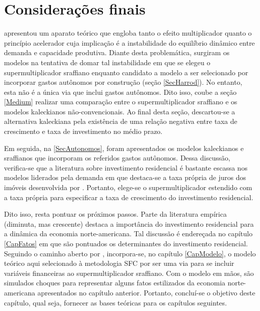 \section{Considerações finais}
\label{Concl1}




\textcite{harrod_essay_1939} apresentou um aparato teórico que engloba tanto o efeito multiplicador quanto o princípio acelerador cuja implicação é a instabilidade do equilíbrio dinâmico entre demanda e capacidade produtiva. Diante desta problemática, surgiram os modelos na tentativa de domar tal instabilidade em que se elegeu o supermultiplicador sraffiano enquanto candidato a modelo a ser selecionado por incorporar gastos autônomos por construção (seção \ref{SecHarrod}). 
No entanto, esta não é a única via que inclui gastos autônomos.
Dito isso, coube a seção \ref{Medium} realizar uma comparação entre o supermultiplicador sraffiano e os modelos kaleckianos não-convencionais.
Ao final desta seção, descartou-se a alternativa kaleckiana pela existência de uma relação negativa entre taxa de crescimento e taxa de investimento no médio prazo.


Em seguida, na \ref{SecAutonomos},
foram apresentados os modelos kaleckianos e sraffianos que incorporam os referidos gastos autônomos.
Dessa discussão, verifica-se que a literatura sobre investimento residencial é bastante escassa nos modelos liderados pela demanda em que destaca-se a taxa própria de juros dos imóveis desenvolvida por \textcite{teixeira_crescimento_2015}.
Portanto, elege-se o supermultiplicador estendido com a taxa própria para especificar a taxa de crescimento do investimento residencial.

Dito isso, resta pontuar os próximos passos.
Parte da literatura empírica (diminuta, mas crescente) destaca a importância do investimento residencial para a dinâmica da economia norte-americana. 
Tal discussão é endereçada no capítulo \ref{CapFatos} em que são pontuados os determinantes do investimento residencial.
Seguindo o caminho aberto por \textcite{brochier_supermultiplier_2018}, 
incorpora-se, no capítulo \ref{CapModelo}, o modelo teórico aqui selecionado à metodologia SFC por ser uma via para se incluir variáveis financeiras ao supermultiplicador sraffiano.
Com o modelo em mãos, são simulados choques para representar alguns fatos estilizados da economia norte-americana apresentados no capítulo anterior.
Portanto, concluí-se o objetivo deste capítulo, qual seja, fornecer as bases teóricas para os capítulos seguintes.


